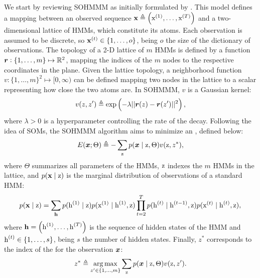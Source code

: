 We start by reviewing SOHMMM as initially formulated by \citet{Ferles2008}. This model defines a mapping between an observed sequence ${\mathbf{x}} \triangleq \left({\textnormal{x}}^{(1)}, \dots, {\textnormal{x}}^{(T)} \right)$ and a two-dimensional lattice of HMMs, which constitute its atoms. Each observation is assumed to be discrete, so ${\mathbf{x}}^{(t)} \in \{1,\dots,o\}$, being $o$ the size of the dictionary of observations. The topology of a 2-D lattice of $m$ HMMs is defined by a function ${\bm{r}}: \{1, \dots, m\} \mapsto \mathbb{R}^2$, mapping the indices of the $m$ nodes to the respective coordinates in the plane. Given the lattice topology, a neighborhood function $v: \{1, \dots, m\}^2 \mapsto [0, \infty)$ can be defined mapping two nodes in the lattice to a scalar representing how close the two atoms are. In SOHMMM, $v$ is a Gaussian kernel:
\begin{equation}
    \label{eq:sohmmm_distance}
    v(z,z') \triangleq \exp\left(-\lambda||{\bm{r}}(z)-{\bm{r}}(z')||^{2}\right),
\end{equation}
where $\lambda > 0$ is a hyperparameter controlling the rate of the decay.
Following the idea of SOMs, the SOHMMM algorithm aims to minimize an , defined below:
\begin{equation}
    \label{eq:sohmmm_energy}
    E({\bm{x}}; \Theta) \triangleq -\sum_{{\textnormal{z}}} p({\bm{x}} \mid {\textnormal{z}}, \Theta)v({\textnormal{z}}, z^*),
\end{equation}
where $\Theta$ summarizes all parameters of the HMMs, ${\textnormal{z}}$ indexes the $m$ HMMs in the lattice, and $p({\mathbf{x}} \mid {\textnormal{z}})$ is the marginal distribution of observations of a standard HMM:
\begin{equation}
    \label{eq:sohmmm_hmm}
    p({\mathbf{x}} \mid {\textnormal{z}}) = \sum_{{\mathbf{h}}} p({\textnormal{h}}^{(1)} \mid {\textnormal{z}}) p({\textnormal{x}}^{(1)} \mid {\textnormal{h}}^{(1)},{\textnormal{z}}) \prod_{t=2}^T p({\textnormal{h}}^{(t)} \mid {\textnormal{h}}^{(t-1)},{\textnormal{z}}) p({\textnormal{x}}^{(t)} \mid {\textnormal{h}}^{(t)},{\textnormal{z}}),
\end{equation}
where ${\mathbf{h}} = \left({\textnormal{h}}^{(1)},\dots,{\textnormal{h}}^{(T)}\right)$ is the sequence of hidden states of the HMM and ${\textnormal{h}}^{(t)} \in \{1, \dots, s\}$, being $s$ the number of hidden states. Finally, $z^*$ corresponds to the index of the  for the observation ${\bm{x}}$:
\begin{equation}
    \label{eq:sohmmm_winner}
    z^* \triangleq \operatorname*{arg\,max}_{z' \in \{1,\dots,m\}} \sum_{{\textnormal{z}}} p({\bm{x}} \mid {\textnormal{z}}, \Theta)v({\textnormal{z}}, z').
\end{equation}

